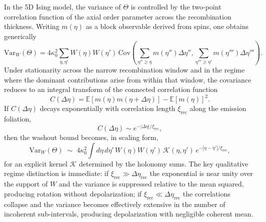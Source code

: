 \documentclass[12pt]{article}
\begin{document}
In the 5D Ising model, the variance of $\Theta$ is controlled by the two-point correlation function of the axial order parameter across the recombination thickness. Writing $m(\eta)$ as a block observable derived from spins, one obtains generically
\begin{equation}
\mathrm{Var}_W(\Theta)
=
4\kappa_0^2
\sum_{\eta,\eta'}
W(\eta)W(\eta')
\,\mathrm{Cov}\!\left(
\sum_{\eta''\ge\eta} m(\eta'')\Delta\eta'',
\sum_{\eta'''\ge\eta'} m(\eta''')\Delta\eta'''
\right).
\end{equation}
Under stationarity across the narrow recombination window and in the regime where the dominant contributions arise from within that window, the covariance reduces to an integral transform of the connected correlation function
\begin{equation}
C(\Delta\eta)
=
\mathbb{E}\!\left[m(\eta)m(\eta+\Delta\eta)\right]-\mathbb{E}[m(\eta)]^2.
\end{equation}
If $C(\Delta\eta)$ decays exponentially with correlation length $\xi_{\mathrm{rec}}$ along the emission foliation,
\begin{equation}
C(\Delta\eta)\sim e^{-|\Delta\eta|/\xi_{\mathrm{rec}}},
\end{equation}
then the washout bound becomes, in scaling form,
\begin{equation}
\mathrm{Var}_W(\Theta)
\;\sim\;
4\kappa_0^2
\int d\eta\,d\eta'\,
W(\eta)W(\eta')\,\mathcal{K}(\eta,\eta')\,e^{-|\eta-\eta'|/\xi_{\mathrm{rec}}},
\end{equation}
for an explicit kernel $\mathcal{K}$ determined by the holonomy sums. The key qualitative regime distinction is immediate: if $\xi_{\mathrm{rec}}\gg \Delta\eta_{\mathrm{rec}}$ the exponential is near unity over the support of $W$ and the variance is suppressed relative to the mean squared, producing rotation without depolarization; if $\xi_{\mathrm{rec}}\ll \Delta\eta_{\mathrm{rec}}$ the correlations collapse and the variance becomes effectively extensive in the number of incoherent sub-intervals, producing depolarization with negligible coherent mean.
\end{document}
